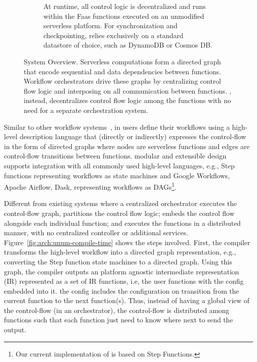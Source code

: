 \begin{figure}[t]
\begin{subfigure}[b]{\columnwidth}
		\caption{At runtime, all \name{} control logic is decentralized and runs within the Faas 
			functions executed on an unmodified serverless platform. For synchronization and checkpointing, \name{} relies exclusively on a
			standard datastore of choice, such as DynamoDB or Cosmos DB.}
		\label{fig:arch:unum-runtime}
	\end{subfigure}
	\caption{\name{} System Overview. Serverless computations form a directed
		graph that encode sequential and data dependencies between functions. Workflow
		orchestrators drive these graphs by centralizing control flow logic and
		interposing on all communication between functions. \name{},
		instead, decentralizes control flow logic among the functions with
		no need for a separate orchestration system.}
	\label{fig:arch}
\end{figure}


Similar to other workflow systems~\cite{aws-step-functions, google-workflows,
	google-cloud-composer, gg-atc}, in \name{} users define their workflows using
a high-level description language that (directly or indirectly) expresses the
control-flow in the form of directed graphs  where nodes are serverless
functions and edges are control-flow transitions between functions.  modular and extensible design supports integration with all commonly used high-level languages, e.g., Step functions representing workflows as state machines and Google
Workflows, Apache Airflow, Dask, representing workflows as DAGs\footnote{Our current implementation of \name{} is based on Step Functions.}.
%

Different from existing systems where a centralized orchestrator executes
the control-flow graph, \name{} partitions the control flow logic;  embeds the control flow alongside each individual function; and executes the functions in a distributed manner, with no centralized controller or additional services. Figure~\ref{fig:arch:unum-compile-time} shows the steps involved. First, the  \name{} compiler transforms the high-level workflow into a directed graph representation, e.g., converting the Step function state machines to a directed graph. Using this graph, the compiler outputs an platform agnostic intermediate representation (IR) represented as a set of IR functions, i.e, the user functions with the \name{} config embedded into it. the \name{} config includes the configuration on transition from the current function to the next function(s). Thus, instead of having a global view of the control-flow (in an orchestrator), the control-flow is distributed among functions such that each function just need to know where next to send the output. 

